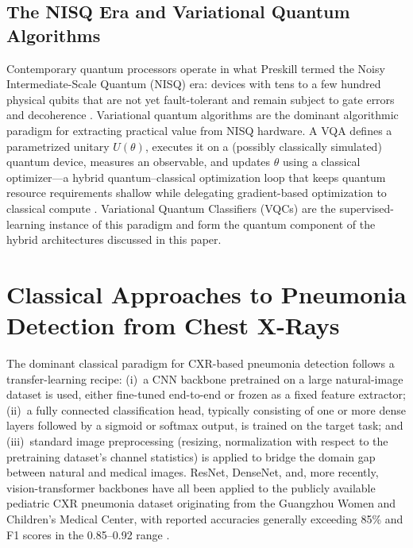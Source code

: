 \documentclass[11pt,a4paper]{article}
\begin{document}
\subsection{The NISQ Era and Variational Quantum Algorithms}

Contemporary quantum processors operate in what Preskill termed the Noisy
Intermediate-Scale Quantum (NISQ) era: devices with tens to a few hundred
physical qubits that are not yet fault-tolerant and remain subject to gate
errors and decoherence \cite{preskill2018}.  Variational quantum algorithms
are the dominant algorithmic paradigm for extracting practical value from NISQ
hardware.  A VQA defines a parametrized unitary $U(\theta)$, executes it on
a (possibly classically simulated) quantum device, measures an observable, and
updates $\theta$ using a classical optimizer---a hybrid quantum--classical
optimization loop that keeps quantum resource requirements shallow while
delegating gradient-based optimization to classical compute
\cite{schuld2018,mitarai2018}.  Variational Quantum Classifiers (VQCs) are the
supervised-learning instance of this paradigm and form the quantum component
of the hybrid architectures discussed in this paper.

\section{Classical Approaches to Pneumonia Detection from Chest X-Rays}
\label{sec:classical}

The dominant classical paradigm for CXR-based pneumonia detection follows a
transfer-learning recipe: (i)~a CNN backbone pretrained on a large
natural-image dataset is used, either fine-tuned end-to-end or frozen as a
fixed feature extractor; (ii)~a fully connected classification head, typically
consisting of one or more dense layers followed by a sigmoid or softmax
output, is trained on the target task; and (iii)~standard image preprocessing
(resizing, normalization with respect to the pretraining dataset's channel
statistics) is applied to bridge the domain gap between natural and medical
images.  ResNet, DenseNet, and, more recently, vision-transformer backbones
have all been applied to the publicly available pediatric CXR pneumonia dataset
originating from the Guangzhou Women and Children's Medical Center, with
reported accuracies generally exceeding 85\% and F1 scores in the
0.85--0.92 range \cite{kundu2021,ortiz2022,naz2020}.
\end{document}
